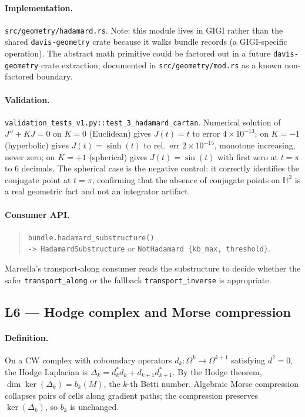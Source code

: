 \documentclass[11pt,letterpaper]{article}
\begin{document}
\paragraph{Implementation.}
\texttt{src/geometry/hadamard.rs}. Note: this
module lives in GIGI rather than the shared \texttt{davis-geometry}
crate because it walks bundle records (a GIGI-specific operation).
The abstract math primitive could be factored out in a future
\texttt{davis-geometry} crate extraction; documented in
\texttt{src/geometry/mod.rs} as a known
non-factored boundary.

\paragraph{Validation.}
\texttt{validation\_tests\_v1.py::test\_3\_hadamard\_cartan}.
Numerical solution of $J'' + KJ = 0$ on
$K = 0$ (Euclidean) gives $J(t) = t$ to error $4 \times 10^{-13}$;
on $K = -1$ (hyperbolic) gives $J(t) = \sinh(t)$ to rel.\ err
$2 \times 10^{-15}$, monotone increasing, never zero; on $K = +1$
(spherical) gives $J(t) = \sin(t)$ with first zero at $t = \pi$ to
6 decimals. The spherical case is the negative control: it
correctly identifies the conjugate point at $t = \pi$, confirming
that the absence of conjugate points on $\mathbb{H}^2$ is a real
geometric fact and not an integrator artifact.

\paragraph{Consumer API.}
\begin{quote}
\sloppy
\texttt{bundle.hadamard\_substructure()}\\
\hphantom{\quad}\texttt{-> HadamardSubstructure}
or \texttt{NotHadamard \{kb\_max, threshold\}}.
\end{quote}
Marcella's transport-along consumer reads the substructure to
decide whether the safer \texttt{transport\_along} or the fallback
\texttt{transport\_inverse} is appropriate.


\subsection{L6 --- Hodge complex and Morse compression}

\paragraph{Definition.}
On a CW complex with coboundary operators
$d_k: \Omega^k \to \Omega^{k+1}$ satisfying $d^2 = 0$, the Hodge
Laplacian is $\Delta_k = d_k^* d_k + d_{k+1} d_{k+1}^*$. By the
Hodge theorem, $\dim \ker(\Delta_k) = b_k(M)$, the $k$-th Betti
number. Algebraic Morse compression collapses pairs of cells along
gradient paths; the compression preserves $\ker(\Delta_k)$, so
$b_k$ is unchanged.
\end{document}

